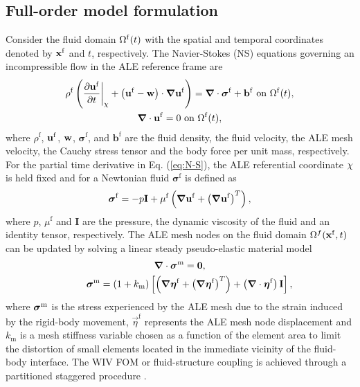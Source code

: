 \subsection{Full-order model formulation}

Consider the fluid domain $\Omega^\mathrm{f}(t)$ with the spatial and temporal coordinates 
denoted by $\mbox{$\mathbf{x}^{\mathrm{f}}$}$ and $t$, respectively.
%
The Navier-Stokes (NS) equations governing an incompressible flow  
in the ALE reference frame are
\begin{gather}
\rho^\mathrm{f} \left( \frac{\partial \mathbf{u}^\mathrm{f}}{\partial t} \bigg\rvert_{\mathbf{\chi}} + \left(\mathbf{u}^\mathrm{f}-\mathbf{w}\right)\cdot \boldsymbol{\nabla} \mathbf{u}^
\mathrm{f} \right ) = \boldsymbol{\nabla} \cdot \boldsymbol{\sigma}^\mathrm{f} + \mathbf{b}^\mathrm{f} \mbox{ on } \Omega^\mathrm{f}(t) \label{eq:N-S}, \\
\boldsymbol{\nabla} \cdot\mathbf{u}^\mathrm{f} = 0 \mbox{ on } \Omega^\mathrm{f}(t) \label{eq:continuity},
\end{gather}
where $\rho^\mathrm{f}$, $\mathbf{u}^\mathrm{f}$, 
$\mathbf{w}$, $\boldsymbol{\sigma}^\mathrm{f}$, and $\mathbf{b}^\mathrm{f}$ 
are the fluid density, the fluid velocity, the ALE mesh velocity, the 
Cauchy stress tensor and the body force per unit mass, respectively. 
%
For the partial time derivative in Eq. (\ref{eq:N-S}), 
the ALE referential coordinate $\mathbf{\chi}$ is held fixed and for a Newtonian fluid
$\boldsymbol{\sigma}^\mathrm{f}$ is defined as
\begin{equation}
\boldsymbol{\sigma}^\mathrm{f} = -p\mathbf{I} + \mu^\mathrm{f}\left(\boldsymbol{\nabla} \mathbf{u}^\mathrm{f} + \left(\boldsymbol{\nabla} \mathbf{u}^\mathrm{f}\right)^T
\right),
\label{eq:cauchyStress}
\end{equation}
%
where $p$, $\mu^\mathrm{f}$ and $ \mathbf{I} $ are the  pressure, the dynamic viscosity of the fluid and an identity tensor, respectively.
The ALE mesh nodes on the fluid domain $\Omega^f(\mbox{$\mathbf{x}^{\mathrm{f}}$},t)$ can be updated by solving a linear steady pseudo-elastic material model
\begin{gather}
\mbox{\boldmath $\nabla$} \cdot {\mbox{\boldmath $\sigma$}}^\mathrm{m} = \mbox{\boldmath $0$}, \\
\qquad {\mbox{\boldmath $\sigma$}}^\mathrm{m} = (1+k_\mathrm{m})\left[\left(\mbox{\boldmath $\nabla$} \mbox{\boldmath $\eta$}^\mathrm{f}+\left(\mbox{\boldmath $\nabla$}
\mbox{\boldmath $\eta$}^\mathrm{f}\right)^T\right)+\left(\mbox{\boldmath $\nabla$} \cdot \mbox{\boldmath $\eta$}^\mathrm{f}\right)\mbox{\boldmath $\mathrm{I}$} \right], 
\label{MeshEq}
\end{gather} 
where ${\mbox{\boldmath $\sigma$}}^\mathrm{m}$ is the stress experienced by the ALE mesh due 
to the strain induced by the rigid-body movement, 
$\vec{\eta}^\mathrm{f}$ represents the ALE mesh node displacement and 
$k_\mathrm{m}$ is a mesh stiffness variable chosen as a function of the element area to 
limit the distortion of small elements located in the immediate vicinity 
of the fluid-body interface.
The WIV FOM or fluid-structure coupling is achieved 
through a partitioned staggered procedure \cite{Jaiman2011,yao_jfm_1}. 
%

